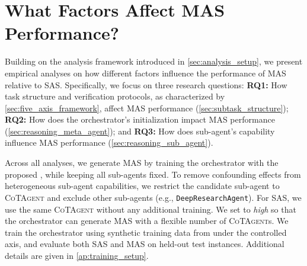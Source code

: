 

\section{What Factors Affect MAS Performance?}
\label{sec:analysis}

Building on the analysis framework introduced in \cref{sec:analysis_setup}, we present empirical analyses on how different factors influence the performance of MAS relative to SAS. Specifically, we focus on three research questions: \textbf{RQ1:} How task structure and verification protocols, as characterized by \cref{sec:five_axis_framework}, affect MAS performance (\cref{sec:subtask_structure}); \textbf{RQ2:} How does the orchestrator’s initialization impact MAS performance (\cref{sec:reasoning_meta_agent}); and \textbf{RQ3:} How does sub-agent's capability influence MAS performance (\cref{sec:reasoning_sub_agent}).

Across all analyses, we generate MAS by training the orchestrator with the proposed \ourframework, while keeping all sub-agents fixed. To remove confounding effects from heterogeneous sub-agent capabilities, we restrict the candidate sub-agent to \textsc{CoTAgent} and exclude other sub-agents (e.g., \texttt{DeepResearchAgent}). For SAS, we use the same \textsc{CoTAgent} without any additional training. {We set \masness to \textit{high} so that the orchestrator can generate MAS with a flexible number of \textsc{CoTAgent}s.}
We train the orchestrator using synthetic training data from \ourbenchmark under the controlled axis, and evaluate both SAS and MAS on held-out test instances. Additional details are given in \cref{ap:training_setup}.

